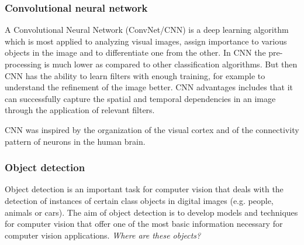 






\subsubsection*{Convolutional neural network}

A Convolutional Neural Network (ConvNet/CNN) is a deep learning algorithm which is most applied to analyzing visual images, assign importance to various objects in the image and to differentiate one from the other. In CNN the pre-processing is much lower as compared to other classification algorithms. But then CNN has the ability to learn filters with enough training, for example to understand the refinement of the image better. CNN advantages includes that it can successfully capture the spatial and temporal dependencies in an image through the application of relevant filters.


CNN was inspired by the organization of the visual cortex and of the connectivity pattern of neurons in the human brain.
\subsubsection*{Object detection}
Object detection is an important task for computer vision that deals with the detection of instances of certain class objects in digital images (e.g. people, animals or cars). The aim of object detection is to develop models and techniques for computer vision that offer one of the most basic information necessary for computer vision applications\cite{zou_object_2019}. \textit{Where are these objects?}


